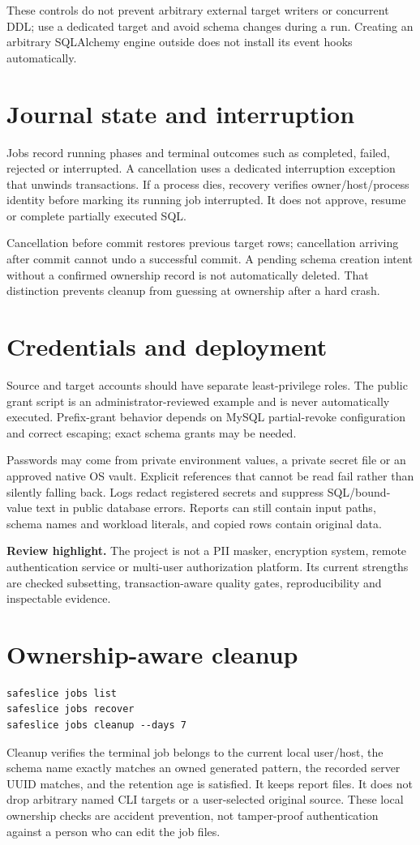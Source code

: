 \documentclass[11pt,a4paper,oneside]{report}
\newcommand{\reviewpoint}[1]{\par\begingroup\setlength{\fboxsep}{9pt}\noindent\colorbox{wash}{\parbox{\dimexpr\linewidth-18pt\relax}{\textbf{Review highlight.} #1}}\endgroup\par}
\begin{document}
These controls do not prevent arbitrary external target writers or concurrent DDL; use a dedicated target and avoid schema changes during a run. Creating an arbitrary SQLAlchemy engine outside  does not install its event hooks automatically.

\section{Journal state and interruption}
Jobs record running phases and terminal outcomes such as completed, failed, rejected or interrupted. A cancellation uses a dedicated interruption exception that unwinds transactions. If a process dies, recovery verifies owner/host/process identity before marking its running job interrupted. It does not approve, resume or complete partially executed SQL.

Cancellation before commit restores previous target rows; cancellation arriving after commit cannot undo a successful commit. A pending schema creation intent without a confirmed ownership record is not automatically deleted. That distinction prevents cleanup from guessing at ownership after a hard crash.

\section{Credentials and deployment}
Source and target accounts should have separate least-privilege roles. The public grant script is an administrator-reviewed example and is never automatically executed. Prefix-grant behavior depends on MySQL partial-revoke configuration and correct escaping; exact schema grants may be needed.

Passwords may come from private environment values, a private secret file or an approved native OS vault. Explicit references that cannot be read fail rather than silently falling back. Logs redact registered secrets and suppress SQL/bound-value text in public database errors. Reports can still contain input paths, schema names and workload literals, and copied rows contain original data.

\reviewpoint{The project is not a PII masker, encryption system, remote authentication service or multi-user authorization platform. Its current strengths are checked subsetting, transaction-aware quality gates, reproducibility and inspectable evidence.}

\section{Ownership-aware cleanup}
\begin{lstlisting}[language={}]
safeslice jobs list
safeslice jobs recover
safeslice jobs cleanup --days 7
\end{lstlisting}
Cleanup verifies the terminal job belongs to the current local user/host, the schema name exactly matches an owned generated pattern, the recorded server UUID matches, and the retention age is satisfied. It keeps report files. It does not drop arbitrary named CLI targets or a user-selected original source. These local ownership checks are accident prevention, not tamper-proof authentication against a person who can edit the job files.
\end{document}
